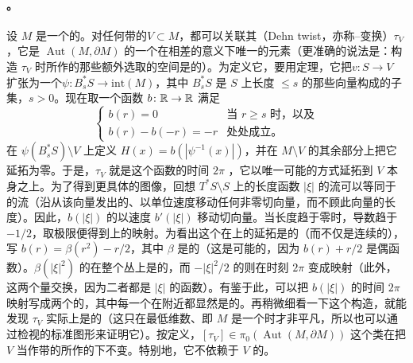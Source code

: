 \paragraph{\trDehnTwist{}。}\label{sub:dehn-twists}
设 $M$ 是一个\trCorneredBoundary{}的\trExactSymplectic\trManifold{}。对任何带\trFrame{}的\trExact\trLagrange\trSphere{}$V\subset M$，都可以关联其\textbf{\trDehnTwist}（Dehn twist，亦称\trPicard--\trLefschetz{}变换）$\tau_V$，它是 $\operatorname{Aut}(M,\partial M)$ 的一个在相差\trIsotopy{}的意义下唯一的元素（更准确的说法是：构造 $\tau_V$ 时所作的那些额外选取的空间是\trContractible{}的）。为定义它，要用\trLagrange\trTubularNeighborhood{}定理，它把\trFrame{}$v\colon S\to V$ 扩张为一个\trSymplectic\trEmbedding{}$\psi\colon B_s^*S\to\mathrm{int}(M)$，其中 $B_s^*S$ 是 $S$ 上长度 $\le s$ 的那些\trCotangent{}向量构成的子集，$s>0$。现在取一个函数 $b\colon\mathbb{R}\to\mathbb{R}$ 满足
\begin{equation}\label{eq:dehn-twist-function}
\begin{cases}
b(r)=0 & \text{当 } r\ge s\text{ 时，以及} \\
b(r)-b(-r)=-r & \text{处处成立。}
\end{cases}
\end{equation}
在 $\psi(B_s^*S)\setminus V$ 上定义 $H(x)=b(|\psi^{-1}(x)|)$，并在 $M\setminus V$ 的其余部分上把它延拓为零。于是，$\tau_V$ 就是这个\trHamiltonian{}函数的时间 $2\pi$ \trFlow{}，它以唯一可能的方式延拓到 $V$ 本身之上。为了得到更具体的图像，回想 $T^*S\setminus S$ 上的长度函数 $|\xi|$ 的\trHamiltonian{}流可以等同于\trNormalization{}的\trGeodesic{}流（沿从该向量发出的\trGeodesic{}、以单位速度移动任何非零切向量，而不顾此向量的长度）。因此，$b(|\xi|)$ 的\trFlow{}以速度 $b'(|\xi|)$ 移动切向量。当长度趋于零时，导数趋于 $-1/2$，取极限便得到\trZeroSection{}上的\trAntipodal{}映射。为看出这个在\trZeroSection{}上的延拓是\trSmooth{}的（而不仅是连续的），写 $b(r)=\beta(r^2)-r/2$，其中 $\beta$ 是\trSmooth{}的（这是可能的，因为 $b(r)+r/2$ 是偶函数）。$\beta(|\xi|^2)$ 的\trFlow{}在整个\trCotangent{}丛上是\trSmooth{}的，而 $-|\xi|^2/2$ 的\trFlow{}则在时刻 $2\pi$ 变成\trAntipodal{}映射（此外，这两个\trHamiltonian{}量\trPoisson{}交换，因为二者都是 $|\xi|$ 的函数）。有鉴于此，可以把 $b(|\xi|)$ 的时间 $2\pi$ 映射写成两个\trSymplectic\trAutomorphism{}的\trComposition，其中每一个在\trZeroSection{}附近都显然是\trSmooth{}的。再稍微细看一下这个构造，就能发现 $\tau_V$ 实际上是\trExact{}的（这只在最低维数、即 $M$ 是一个\trSurface{}时才非平凡，所以也可以通过检视\trDehnTwist{}的标准图形来证明它）。按定义，$[\tau_V]\in\pi_0(\operatorname{Aut}(M,\partial M))$ 这个类在把 $V$ 当作带\trFrame{}的\trExact\trLagrange\trSphere{}所作的\trIsotopy{}下不变。特别地，它不依赖于 $V$ 的\trOrientation{}。
